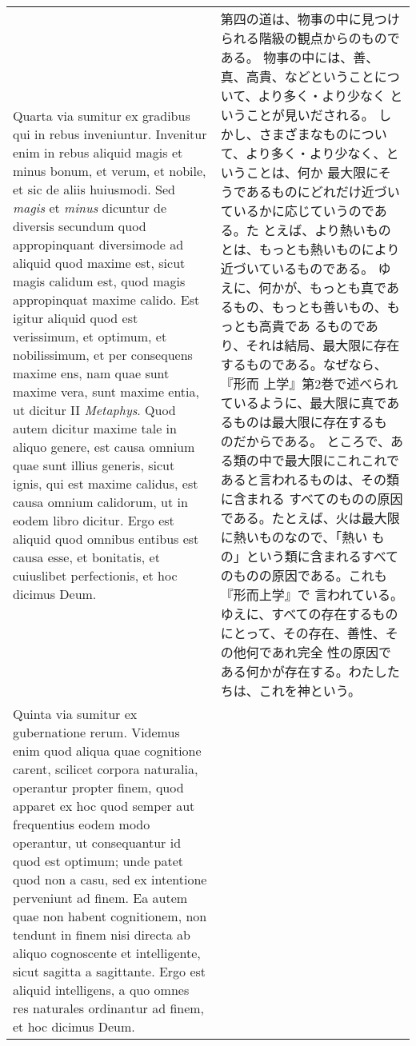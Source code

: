 \documentclass[10pt]{jsarticle} %
\begin{document}
\begin{longtable}{p{21em}p{21em}}
\\


Quarta via sumitur ex gradibus qui in rebus
inveniuntur. Invenitur enim in rebus aliquid magis et minus bonum, et
verum, et nobile, et sic de aliis huiusmodi. Sed {\it magis} et {\it minus} dicuntur
de diversis secundum quod appropinquant diversimode ad aliquid quod
maxime est, sicut magis calidum est, quod magis appropinquat maxime
calido. Est igitur aliquid quod est verissimum, et optimum, et
nobilissimum, et per consequens maxime ens, nam quae sunt maxime vera,
sunt maxime entia, ut dicitur II {\it Metaphys}. Quod autem dicitur maxime
tale in aliquo genere, est causa omnium quae sunt illius generis, sicut
ignis, qui est maxime calidus, est causa omnium calidorum, ut in eodem
libro dicitur. Ergo est aliquid quod omnibus entibus est causa esse, et
bonitatis, et cuiuslibet perfectionis, et hoc dicimus Deum. 


&
第四の道は、物事の中に見つけられる階級の観点からのものである。
物事の中には、善、真、高貴、などということについて、より多く・より少なく
 ということが見いだされる。
しかし、さまざまなものについて、より多く・より少なく、ということは、何か
 最大限にそうであるものにどれだけ近づいているかに応じていうのである。た
 とえば、より熱いものとは、もっとも熱いものにより近づいているものである。
ゆえに、何かが、もっとも真であるもの、もっとも善いもの、もっとも高貴であ
 るものであり、それは結局、最大限に存在するものである。なぜなら、『形而
 上学』第2巻で述べられているように、最大限に真であるものは最大限に存在するも
 のだからである。
ところで、ある類の中で最大限にこれこれであると言われるものは、その類に含まれる
 すべてのものの原因である。たとえば、火は最大限に熱いものなので、「熱い
 もの」という類に含まれるすべてのものの原因である。これも『形而上学』で
 言われている。
ゆえに、すべての存在するものにとって、その存在、善性、その他何であれ完全
 性の原因である何かが存在する。わたしたちは、これを神という。


\\


Quinta via
sumitur ex gubernatione rerum. Videmus enim quod aliqua quae cognitione
carent, scilicet corpora naturalia, operantur propter finem, quod
apparet ex hoc quod semper aut frequentius eodem modo operantur, ut
consequantur id quod est optimum; unde patet quod non a casu, sed ex
intentione perveniunt ad finem. Ea autem quae non habent cognitionem,
non tendunt in finem nisi directa ab aliquo cognoscente et intelligente,
sicut sagitta a sagittante. Ergo est aliquid intelligens, a quo omnes
res naturales ordinantur ad finem, et hoc dicimus Deum.



\end{longtable}
\end{document}
